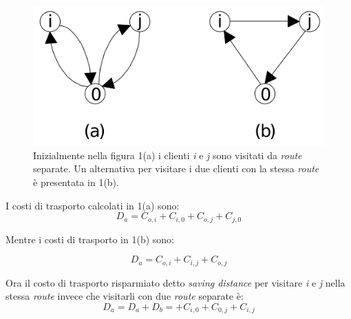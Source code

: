 \documentclass[]{article}
\begin{document}
\begin{figure}[h!]
	\centering
	\includegraphics[scale=0.25]{images/saving.png}
	\caption{Inizialmente nella figura 1(a) i clienti \emph{i} e \emph{j} sono visitati da \emph{route} separate. Un alternativa per visitare i due clienti con la stessa \emph{route} è presentata in 1(b). }
	\label{fig:saving}
\end{figure}

I costi di trasporto calcolati in 1(a) sono:
\begin{equation}
D_{a} = C_{o,i} +C_{i,0} + C_{o,j} + C_{j,0}
\end{equation}

Mentre i costi di trasporto in 1(b) sono:

\begin{equation}
D_{a} = C_{o,i} +C_{i,j} + C_{o,j} 
\end{equation}

Ora il costo di trasporto risparmiato detto \emph{saving distance} per visitare \emph{i} e \emph{j} nella stessa \emph{route} invece che visitarli con due \emph{route} separate è:
\begin{equation}
D_{a} = D_{a} +D_{b} =+ C_{i,0} +  C_{0,j} +  C_{i,j} 
\end{equation}
\end{document}
